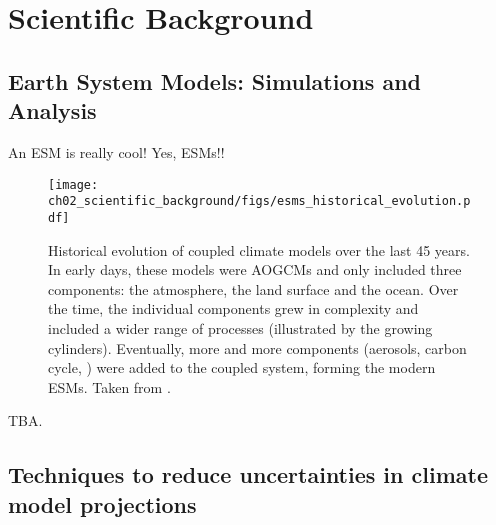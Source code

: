 


\chapter{Scientific Background}
\label{ch:02:scientific_background}


\section{Earth System Models: Simulations and Analysis}
\label{sec:02:esms}

An \ac{ESM} is really cool! Yes, \acp{ESM}!!

\begin{figure}[t]
  \centering
  \texttt{[image: 
    ch02\_scientific\_background/figs/esms\_historical\_evolution.pdf]}
  \caption{Historical evolution of coupled climate models over the last 45
  years. In early days, these models were \acfp{AOGCM} and only included three
  components: the atmosphere, the land surface and the ocean. Over the time,
  the individual components grew in complexity and included a wider range of
  processes (illustrated by the growing cylinders). Eventually, more and more
  components (aerosols, carbon cycle, \etc{}) were added to the coupled system,
  forming the modern \acfp{ESM}. Taken from \textcite{Cubasch2013}.}
  \label{fig:02:esms_historical_evolution}
\end{figure}

TBA.


\section{Techniques to reduce uncertainties in climate model projections}
\label{sec:02:techniques}